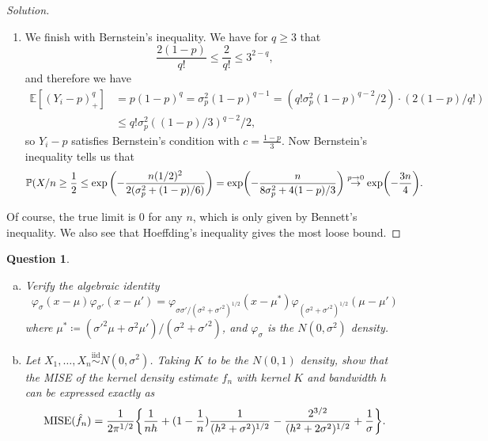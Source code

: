 \documentclass{article}
\theoremstyle{plain}
\newtheorem{question}{Question}
\theoremstyle{remark}
\newenvironment{solution}{\begin{proof}[Solution]\renewcommand\qedsymbol{}}{\end{proof}}
\renewcommand{\phi}{\varphi}
\newcommand{\Bb}{\mathbb}
\newcommand{\Rm}{\mathrm}
\newcommand{\PP}{\Bb P}
\newcommand{\EE}{\Bb E}
\newcommand\ceq\coloneqq %
\newcommand\iid{\overset{\Rm{iid}}{\sim}}
\DeclareMathOperator\MISE{MISE}
\begin{document}
\begin{solution}
\begin{enumerate}
\item We finish with Bernstein's inequality.  We have for $q \geq 3$ that
\[
\frac{2(1-p)}{q!} \leq \frac2{q!} \leq 3^{2-q}, 
\]
and therefore we have
\begin{align*}
	\EE[(Y_i - p)_+^q] &= p(1-p)^q = \sigma_p^2 (1-p)^{q-1} = (q! \sigma_p^2 (1-p)^{q-2}/2)\cdot (2(1-p)/q!) \\
	&\leq q!\sigma_p^2 ((1-p)/3)^{q-2}/2,
\end{align*}
so $Y_i - p$ satisfies Bernstein's condition with $c = \frac{1-p}{3}$.
Now Bernstein's inequality tells us that
\[
\PP(X/n \geq \frac12 \leq \exp\qty(- \frac{n(1/2)^2}{2(\sigma_p^2 + (1-p)/6)}) = \exp(- \frac{n}{8\sigma_p^2 + 4(1-p)/3}) \overset{p \to 0}{\to} \exp(-\frac{3n}{4}). \]
	\end{enumerate}
Of course, the true limit is 0 for any $n$, which is only given by Bennett's inequality. We also see that Hoeffding's inequality gives the most loose bound. 

\end{solution}

\setcounter{question}{9}



\begin{question}
	\begin{enumerate}[(a)]
		\item 	Verify the algebraic identity
		\[
		\phi_\sigma(x-\mu)\phi_{\sigma'}(x-\mu') = \phi_{\sigma\sigma'/(\sigma^2 + \sigma'^2)^{1/2}}(x - \mu^*) \phi_{(\sigma^2 + \sigma'^2)^{1/2}}(\mu - \mu')
		\]
		where $\mu^* \ceq (\sigma'^2 \mu + \sigma^2\mu') / (\sigma^2 + \sigma'^2)$, and $\phi_\sigma$ is the $N(0, \sigma^2)$ density. 
		
		\item Let $X_1, \dotsc, X_n \iid N(0, \sigma^2)$. Taking $K$ to be the $N(0, 1)$ density, show that the MISE of the kernel density estimate $\hat f_n$ with kernel $K$ and bandwidth $h$ can be expressed exactly as
		\[
		\MISE(\hat f_n) = \frac1{2\pi^{1/2}} \qty{\frac1{nh} + (1 - \frac1n) \frac{1}{(h^2 + \sigma^2)^{1/2}} - \frac{2^{3/2}}{(h^2 + 2\sigma^2)^{1/2}} + \frac1\sigma}. 
		\]
	\end{enumerate}

\end{question}
\end{document}
